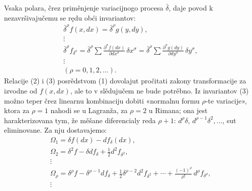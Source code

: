 \documentclass[11pt]{article}
\providecommand{\bdelta}{\bar{\delta}}
\begin{document}
Vsaka polara, črez priměnjenje variacijnogo procesa \(\bdelta\), daje povod k nezavršivajučemu se rędu obći invariantov:
\begin{equation}
\begin{gathered}
\bdelta^\rho f(x,dx)=\bdelta^\rho g(y,dy),\\
\vdots\\
\bdelta^\rho f_{\delta^\sigma}
=\bdelta^\rho\sum\frac{\partial^\sigma f(dx)}{\partial dx^\sigma}\,
\delta x^\sigma
=\bdelta^\rho\sum\frac{\partial^\sigma g(dy)}{\partial dy^\sigma}\,
\delta y^\sigma,\\
\vdots\\[0.2em]
(\rho=0,1,2,\ldots).
\end{gathered}
\tag{3}
\end{equation}
Relacije (2) i (3) posrědstvom (1) dovolajut pročitati zakony transformacije za izvodne od \(f(x,dx)\), ale to v slědujučem ne bude potrěbno. Iz invariantov (3) možno teper črez linearnu kombinaciju dobiti «normalnu formu \(\rho\)-te variacije», ktora za \(\rho=1\) nahodi se u Lagranža, za \(\rho=2\) u Rimana; ona jest harakterizovana tym, že měšane diferencialy reda \(\rho+1\): \(d^\rho\delta\), \(d^{\rho-1}\delta^2,\ldots\), sut eliminovane. Za nju dostavajemo:
\begin{equation}
\begin{gathered}
\Omega_1=\delta f(dx)-d f_\delta(dx),\\
\Omega_2=\delta^2 f-\delta d f_\delta+\frac12 d^2 f_{\delta^2},\\
\vdots\\
\Omega_\rho=\delta^\rho f-\delta^{\rho-1}d f_\delta
+\frac12\delta^{\rho-2}d^2 f_{\delta^2}
+\cdots+\frac{(-1)^\rho}{\rho!}\,d^\rho f_{\delta^\rho},\\
\vdots
\end{gathered}
\tag{4}
\end{equation}
\end{document}
